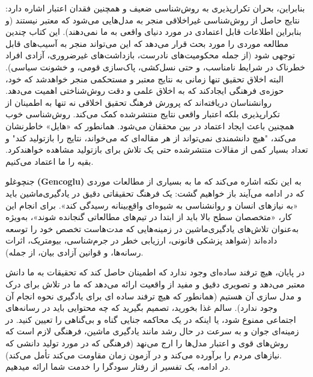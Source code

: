 بنابراین، بحران تکرارپذیری به روش‌شناسی ضعیف و همچنین فقدان اعتبار اشاره دارد: نتایج حاصل از روش‌شناسی غیراخلاقی منجر به مدل‌هایی می‌شود که معتبر نیستند (و بنابراین اطلاعات قابل اعتمادی در مورد دنیای واقعی به ما نمی‌دهند).
این کتاب چندین مطالعه موردی را مورد بحث قرار می‌دهد که این می‌تواند منجر به آسیب‌های قابل توجهی شود (از جمله محکومیت‌های نادرست، بازداشت‌های غیرضروری، آزادی افراد خطرناک در شرایط نامناسب، و حتی نسل‌کشی، پاک‌سازی قومی، و خشونت سیاسی).
البته اخلاق تحقیق تنها زمانی به نتایج معتبر و مستحکمی منجر خواهدشد که خود، حوزه‌ی فرهنگی ایجاد‌کند که به اخلاق علمی و دقت روش‌شناختی اهمیت می‌دهد.
روانشناسان دریافته‌اند که پرورش فرهنگ تحقیق اخلاقی نه تنها به اطمینان از تکرارپذیری بلکه اعتبار واقعی نتایج منتشر‌شده کمک می‌کند.
روش‌شناسی خوب همچنین باعث ایجاد اعتماد در بین محققان می‌شود.
همانطور که «هایل» خاطرنشان می‌کند، "هیچ دانشمندی نمی‌تواند از هر مقاله‌ای که می‌خواند، نتایج را بازتولید کند" و تعداد بسیار کمی از مقالات منتشر‌شده حتی یک تلاش برای بازتولید مشاهده خواهند‌کرد.
بقیه را ما اعتماد می‌کنیم.

جنچوغلو \textenglish{\textbf{(Gencoglu)}} به این نکته اشاره می‌کند که ما به بسیاری از مطالعات موردی که در ادامه می‌آیند باز خواهیم گشت: یک فرهنگ تحقیقاتی دقیق در یادگیری‌ماشین باید «به نیازهای انسان و روانشناسی به شیوه‌ای واقع‌بینانه رسیدگی کند».
برای انجام این کار، «متخصصان سطح بالا باید از ابتدا در تیم‌های مطالعاتی گنجانده شوند»، به‌ویژه به‌عنوان تلاش‌های یادگیری‌ماشین در زمینه‌هایی که مدت‌هاست تخصص خود را توسعه داده‌اند (شواهد پزشکی قانونی، ارزیابی خطر در جرم‌شناسی، بیومتریک، اثرات رسانه‌ها، و قوانین آزادی بیان، از جمله).

در پایان، هیچ ترفند ساده‌ای وجود ندارد که اطمینان حاصل کند که تحقیقات به ما دانش معتبر می‌دهد و تصویری دقیق و مفید از واقعیت ارائه می‌دهد که ما در تلاش برای درک و مدل سازی آن هستیم (همانطور که هیچ ترفند ساده ای برای یادگیری نحوه انجام آن وجود ندارد).
سالم غذا بخورید، تصمیم بگیرید که چه محتوایی باید در رسانه‌های اجتماعی ممنوع شود، یا اینکه در یک محاکمه جنایی گناه و بی‌گناهی را تعیین کنید.
در زمینه‌ای جوان و به سرعت در حال رشد مانند یادگیری ماشین، فرهنگی لازم است که روش‌های قوی و اعتبار مدل‌ها را ارج می‌نهد (فرهنگی که در مورد تولید دانشی که نیازهای مردم را برآورده می‌کند و در آزمون زمان مقاومت می‌کند تأمل می‌کند).
\\
در ادامه‌، یک تفسیر از رفتار سودگرا را خدمت شما ارائه میدهیم.

\newpage

